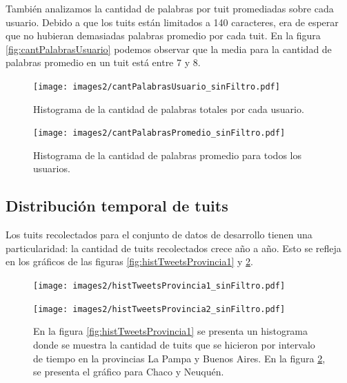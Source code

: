 También analizamos la cantidad de palabras por tuit promediadas sobre cada usuario.
Debido a que los tuits están limitados a 140 caracteres, era de esperar que no hubieran demasiadas palabras promedio por cada tuit. En la figura \ref{fig:cantPalabrasUsuario} podemos observar que la media para la cantidad de palabras promedio en un tuit está entre 7 y 8.
\begin{figure}[!ht]\centering
  \begin{minipage}[t]{0.49\textwidth}
    \texttt{[image: images2/cantPalabrasUsuario\_sinFiltro.pdf]}
    \caption{Histograma de la cantidad de palabras totales por cada usuario.} 
    \label{fig:cantPalabrasUsuario} 
   \end{minipage}
   \begin{minipage}[t]{0.49\textwidth}
    \texttt{[image: images2/cantPalabrasPromedio\_sinFiltro.pdf]}
    \caption{Histograma de la cantidad de palabras promedio para todos los usuarios.} 
    \label{fig:cantPalabrasPromedio} 
   \end{minipage}
   
\end{figure}

\subsection{Distribución temporal de tuits}
Los tuits recolectados para el conjunto de datos de desarrollo tienen una particularidad: la cantidad de tuits recolectados crece año a año. Esto se refleja en los gráficos de las figuras \ref{fig:histTweetsProvincia1} y \ref{fig:histTweetsProvincia2}.

\begin{figure}[!ht]\centering
   \begin{minipage}[t]{0.49\textwidth}
     \texttt{[image: images2/histTweetsProvincia1\_sinFiltro.pdf]}
     \caption{}
     \label{fig:histTweetsProvincia1}
   \end{minipage}
   \begin {minipage}[t]{0.49\textwidth}
     \texttt{[image: images2/histTweetsProvincia2\_sinFiltro.pdf]}
     \caption{}
     \label{fig:histTweetsProvincia2}
   \end{minipage}
   \caption { En la figura \ref{fig:histTweetsProvincia1} se presenta un histograma donde se muestra la cantidad de tuits que se hicieron por intervalo de tiempo en la provincias La Pampa y Buenos Aires. En la figura \ref{fig:histTweetsProvincia2}, se presenta el gráfico para Chaco y Neuquén.}
\end{figure}



